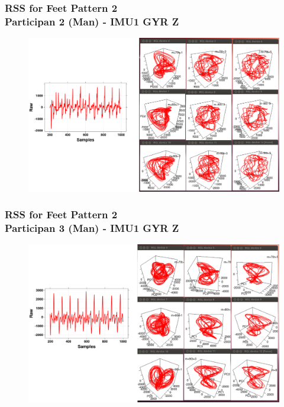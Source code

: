 \documentclass{beamer}
\begin{document}
\begin{frame}
\frametitle{RSS for Feet Pattern 2 \\ Participan 2 (Man) - IMU1 GYR Z }
\vspace{-0.5cm}

\begin{figure}
\centering 
\includegraphics[scale=0.25]{man0} \\
\end{figure}

\end{frame}

\begin{frame}
\frametitle{RSS for Feet Pattern 2 \\ Participan 3 (Man) - IMU1 GYR Z }
\vspace{-0.5cm}

\begin{figure}
\centering 
\includegraphics[scale=0.25]{man1} \\
\end{figure}

\end{frame}
\end{document}
